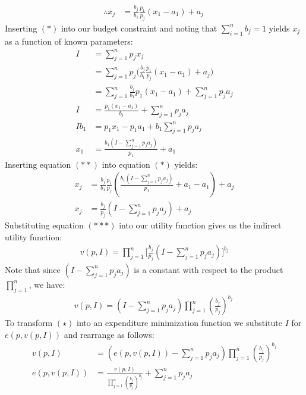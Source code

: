 \documentclass{article}
\begin{document}
\begin{itemize}
\begin{itemize}
\begin{align*}
      \therefore x_{j} &= \frac{b_{j}}{b_{1}}\frac{p_{1}}{p_{j}} (x_{1} - a_{1}) + a_{j} \ \tag{*}
    \end{align*}
    Inserting $(*)$ into our budget constraint and noting that $\sum_{i=1}^{n} b_{j} = 1$ yields $x_{j}$ as a function of known parameters:
    \begin{align*}
      I &= \sum_{j=1}^{n} p_{j}x_{j} \\
      &= \sum_{j=1}^{n} p_{j}\big( \frac{b_{j}}{b_{1}}\frac{p_{1}}{p_{j}} (x_{1} - a_{1}) + a_{j} \big) \\
      &= \sum_{j=1}^{n} \frac{b_{j}}{b_{1}} p_{1}(x_{1} - a_{1}) + \sum_{j=1}^{n} p_{j} a_{j} \\
      I &= \frac{p_{1}(x_{1} - a_{1})}{b_{1}} + \sum_{j=1}^{n} p_{j}a_{j} \\
      I b_{1} &= p_{1}x_{1} - p_{1}a_{1} + b_{1} \sum_{j=1}^{n} p_{j}a_{j} \\
      x_{1} &= \frac{b_{1}(I - \sum_{j=1}^{n}p_{j}a_{j})}{p_{1}} + a_{1} \ \tag{**}
    \end{align*}
    Inserting equation $(**)$ into equation $(*)$ yields:
    \begin{align*}
      x_{j} &= \frac{b_{j}}{b_{1}} \frac{p_{1}}{p_{j}} (\frac{b_{1}(I - \sum_{j=1}^{n}p_{j}a_{j})}{p_{1}} + a_{1} - a_{1}) + a_{j} \\
      x_{j} &= \frac{b_{j}}{p_{j}}(I - \sum_{j=1}^{n}p_{j}a_{j}) + a_{j} \ \tag{***}
    \end{align*}
    Substituting equation $(***)$ into our utility function gives us the indirect utility function:
    \begin{gather*}
      v(p,I) = \prod_{j=1}^{n} \big[ \frac{b_{j}}{p_{j}}(I - \sum_{j=1}^{n}p_{j}a_{j}) \big]^{b_{j}}
    \end{gather*}
    Note that since $(I - \sum_{j=1}^{n}p_{j}a_{j})$ is a constant with respect to the product $\prod_{j=1}^{n}$, we have:
    \begin{gather*}
      v(p,I) = (I - \sum_{j=1}^{n}p_{j}a_{j}) \prod_{j=1}^{n} (\frac{b_{j}}{p_{j}})^{b_{j}} \ \tag{$\star$}
    \end{gather*}
    To transform $(\star)$ into an expenditure minimization function we substitute $I$ for $e(p,v(p,I))$ and rearrange as follows:
    \begin{align*}
      v(p,I) &= (e(p,v(p,I)) - \sum_{j=1}^{n}p_{j}a_{j}) \prod_{j=1}^{n} (\frac{b_{j}}{p_{j}})^{b_{j}} \\
      e(p,v(p,I)) &= \frac{v(p,I)}{\prod_{j=1}^{n} (\frac{b_{j}}{p_{j}})^{b_{j}}} + \sum_{j=1}^{n}p_{j}a_{j} \\

\end{align*}
\end{itemize}
\end{itemize}
\end{document}
